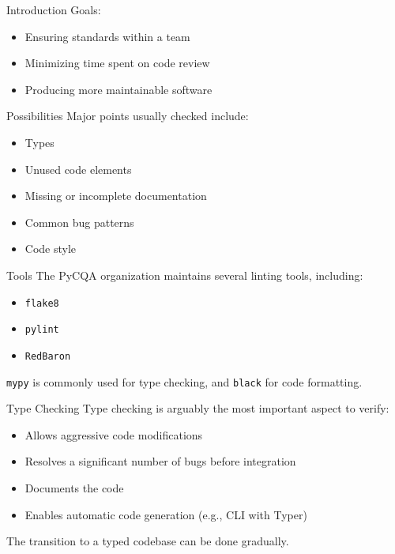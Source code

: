 \begin{frame}{Introduction}
  Goals:
  \begin{itemize}
    \item Ensuring standards within a team
    \item Minimizing time spent on code review
    \item Producing more maintainable software
  \end{itemize}
\end{frame}

\begin{frame}{Possibilities}
  Major points usually checked include:
  
  \begin{itemize}
    \item Types
    \item Unused code elements
    \item Missing or incomplete documentation
    \item Common bug patterns
    \item Code style
  \end{itemize}
\end{frame}

\begin{frame}{Tools}
  The PyCQA organization maintains several linting tools, including:
  
  \begin{itemize}
    \item \texttt{flake8}
    \item \texttt{pylint}
    \item \texttt{RedBaron}
  \end{itemize}
  
  \texttt{mypy} is commonly used for type checking, and \texttt{black} for code formatting.
\end{frame}

\begin{frame}{Type Checking}
  Type checking is arguably the most important aspect to verify:
  
  \begin{itemize}
    \item Allows aggressive code modifications
    \item Resolves a significant number of bugs before integration
    \item Documents the code
    \item Enables automatic code generation (e.g., CLI with Typer)
  \end{itemize}
  
  The transition to a typed codebase can be done gradually.
\end{frame}

